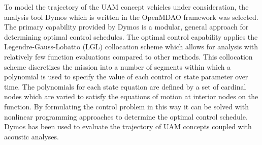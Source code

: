 
To model the trajectory of the UAM concept vehicles under consideration, the analysis tool Dymos which is written in the OpenMDAO framework was selected.\cite{falck2019optimal}
The primary capability provided by Dymos is a modular, general approach for determining optimal control schedules.
The optimal control capability applies the Legendre-Gauss-Lobatto (LGL) collocation scheme which allows for analysis with relatively few function evaluations compared to other methods.\cite{falckpointer2016}
This collocation scheme discretizes the mission into a number of segments within which a polynomial is used to specify the value of each control or  state parameter over time.
The polynomials for each state equation are defined by a set of cardinal nodes which are varied to satisfy the equations of motion at interior nodes on the function.  
By formulating the control problem in this way it can be solved with nonlinear programming approaches to determine the optimal control schedule.\cite{falckpointer2016}
Dymos has been used to evaluate the trajectory of UAM concepts coupled with acoustic analyses\cite{falck2018multi}.
